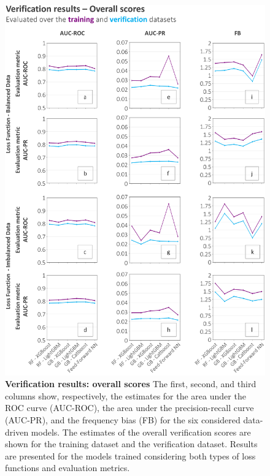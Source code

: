 \documentclass[nhess, manuscript]{copernicus}
\begin{document}
\begin{figure}[t]
\includegraphics[width=12cm]{figures/verif_training_test_overall.png}
\caption{\textbf{Verification results: overall scores} The first, second, and third columns show, respectively, the estimates for the area under the ROC curve (AUC-ROC), the area under the precision-recall curve (AUC-PR), and the frequency bias (FB) for the six considered data-driven models. The estimates of the overall verification scores are shown for the \textcolor{colourTraining}{training dataset} and the \textcolor{colourTest}{verification dataset}. Results are presented for the models trained considering both types of loss functions and evaluation metrics.}
\label{fig:verif_training_test_overall}
\end{figure}
\end{document}

